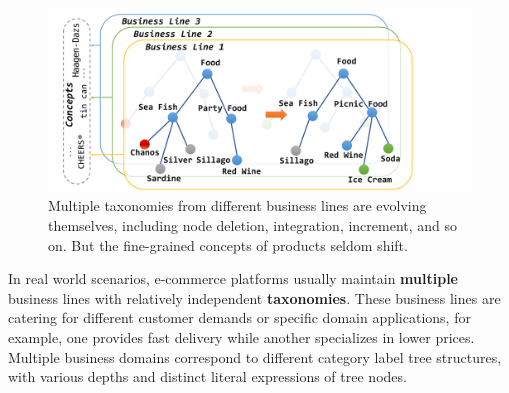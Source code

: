 
\begin{figure}[tbp]
  \centering
  \includegraphics[width=\linewidth]{fig1}
  \caption{
  Multiple taxonomies from different business lines are evolving themselves, including node deletion, integration, increment, and so on. But the fine-grained concepts of products seldom shift. }
  \label{fig:teaser}
\end{figure}

In real world scenarios, e-commerce platforms usually maintain \textbf{multiple} business lines with relatively independent \textbf{taxonomies}.
These business lines are catering for different customer demands or 
specific domain applications, 
for example, one provides fast delivery while another specializes in lower prices.
Multiple business domains correspond to different category label tree structures, with various depths and distinct literal expressions of tree nodes. 

